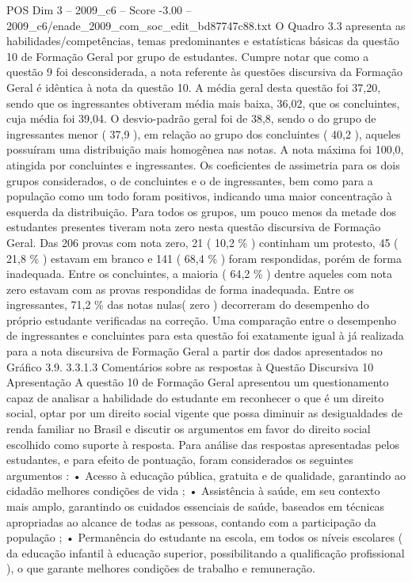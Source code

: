 \begin{textsample}{POS Dim 3 – 2009\_c6 – Score -3.00 – 2009\_c6/enade\_2009\_com\_soc\_edit\_bd87747c88.txt}
O Quadro 3.3 apresenta as habilidades/competências, temas predominantes e estatísticas básicas da questão 10 de Formação Geral por grupo de estudantes.
Cumpre notar que como a questão 9 foi desconsiderada, a nota referente às questões discursiva da Formação Geral é idêntica à nota da questão 10.
A média geral desta questão foi 37,20, sendo que os ingressantes obtiveram média mais baixa, 36,02, que os concluintes, cuja média foi 39,04.
O desvio-padrão geral foi de 38,8, sendo o do grupo de ingressantes menor ( 37,9 ), em relação ao grupo dos concluintes ( 40,2 ), aqueles possuíram uma distribuição mais homogênea nas notas.
A nota máxima foi 100,0, atingida por concluintes e ingressantes.
Os coeficientes de assimetria para os dois grupos considerados, o de concluintes e o de ingressantes, bem como para a população como um todo foram positivos, indicando uma maior concentração à esquerda da distribuição.
Para todos os grupos, um pouco menos da metade dos estudantes presentes tiveram nota zero nesta questão discursiva de Formação Geral.
Das 206 provas com nota zero, 21 ( 10,2 \% ) continham um protesto, 45 ( 21,8 \% ) estavam em branco e 141 ( 68,4 \% ) foram respondidas, porém de forma inadequada.
Entre os concluintes, a maioria ( 64,2 \% ) dentre aqueles com nota zero estavam com as provas respondidas de forma inadequada.
Entre os ingressantes, 71,2 \% das notas nulas( zero ) decorreram do desempenho do próprio estudante verificadas na correção.
Uma comparação entre o desempenho de ingressantes e concluintes para esta questão foi exatamente igual à já realizada para a nota discursiva de Formação Geral a partir dos dados apresentados no Gráfico 3.9. 3.3.1.3 Comentários sobre as respostas à Questão Discursiva 10 Apresentação A questão 10 de Formação Geral apresentou um questionamento capaz de analisar a habilidade do estudante em reconhecer o que é um direito social, optar por um direito social vigente que possa diminuir as desigualdades de renda familiar no Brasil e discutir os argumentos em favor do direito social escolhido como suporte à resposta.
Para análise das respostas apresentadas pelos estudantes, e para efeito de pontuação, foram considerados os seguintes argumentos : • Acesso à educação pública, gratuita e de qualidade, garantindo ao cidadão melhores condições de vida ; • Assistência à saúde, em seu contexto mais amplo, garantindo os cuidados essenciais de saúde, baseados em técnicas apropriadas ao alcance de todas as pessoas, contando com a participação da população ; • Permanência do estudante na escola, em todos os níveis escolares ( da educação infantil à educação superior, possibilitando a qualificação profissional ), o que garante melhores condições de trabalho e remuneração.

\end{textsample}
